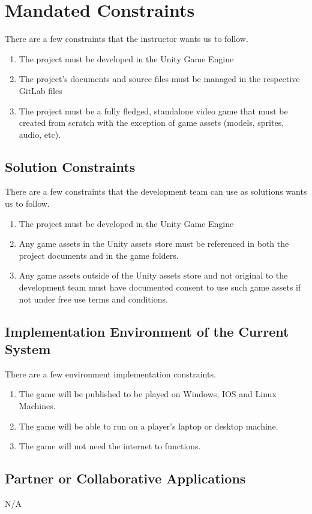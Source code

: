 \documentclass{article}
\begin{document}
\section{Mandated Constraints}
\quad There are a few constraints that the instructor wants us to follow.
\begin{enumerate}[{MC}1. ]
	\item The project must be developed in the Unity Game Engine
	\item The project's documents and source files must be managed in the respective GitLab files
	\item The project must  be a fully fledged, standalone video game that must be created from scratch with the exception of game assets (models, sprites, audio, etc).
\end{enumerate}
\subsection{Solution Constraints}
\quad There are a few constraints that the development team can use as solutions wants us to follow.
\begin{enumerate}[{SC}1. ]
	\item The project must be developed in the Unity Game Engine
	\item Any game assets in the Unity assets store must be referenced in both the project documents and in the game folders. 
	\item Any game assets outside of the Unity assets store and not original to the development team must have documented consent to use such game assets if not under free use terms and conditions.
\end{enumerate}
\subsection{Implementation Environment of the Current System}
\quad There are a few environment implementation constraints.
\begin{enumerate}[{IE}1. ]
	\item The game will be published to be played on Windows, IOS and Linux Machines.
	\item The game will be able to run on a player's laptop or desktop machine. 
	\item The game will not need the internet to functions.
\end{enumerate}
\subsection{Partner or Collaborative Applications}
N/A
\end{document}
